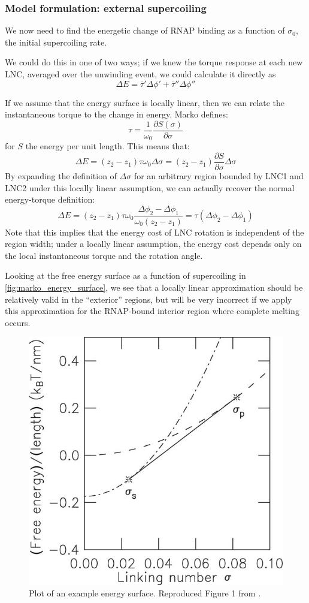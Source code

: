 \documentclass[11pt]{article}
\begin{document}
\subsubsection{Model formulation: external supercoiling}
We now need to find the energetic change of RNAP binding as a function of \(\sigma_0\), the initial supercoiling rate.

We could do this in one of two ways; if we knew the torque response at each new LNC, averaged over the unwinding event, we could calculate it directly as
\begin{equation}
    \Delta E = \overline \tau' \Delta \phi' + \overline \tau'' \Delta \phi''
    \label{eq:direct_torque_calc}
\end{equation}

If we assume that the energy surface is locally linear, then we can relate the instantaneous torque to the change in energy. Marko defines:
\[ \tau = \frac{1}{\omega_0} \frac{\partial S(\sigma)}{\partial \sigma}\]
for \(S\) the energy per unit length. This means that:
\begin{equation}
    \Delta E = (z_2 - z_1) \tau \omega_0 \Delta \sigma = (z_2 - z_1) \frac{\partial S}{\partial \sigma} \Delta \sigma
\end{equation}
By expanding the definition of \(\Delta \sigma\) for an arbitrary region bounded by LNC1 and LNC2 under this locally linear assumption, we can actually recover the normal energy-torque definition:
\[\Delta E = (z_2 - z_1) \tau \omega_0 \frac{\Delta\phi_2 - \Delta\phi_1}{\omega_0 (z_2 - z_1)} = \tau (\Delta \phi_2 - \Delta\phi_1)\]
Note that this implies that the energy cost of LNC rotation is independent of the region width; under a locally linear assumption, the energy cost depends only on the local instantaneous torque and the rotation angle.

Looking at the free energy surface as a function of supercoiling in \autoref{fig:marko_energy_surface}, we see that a locally linear approximation should be relatively valid in the  ``exterior'' regions, but will be very incorrect if we apply this approximation for the RNAP-bound interior region where complete melting occurs.

\begin{figure}[h]
    \centering
    \includegraphics[width=.5\linewidth]{figures/marko_linking_number_graph}
    \caption{Plot of an example energy surface. Reproduced Figure 1 from \textcite{markoTorqueDynamicsLinking2007}.}
    \label{fig:marko_energy_surface}
\end{figure}
\end{document}
